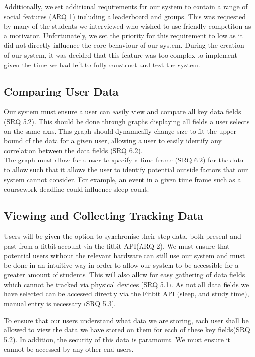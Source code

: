 \documentclass[12pt]{article}
\begin{document}
Additionally, we set additional requirements for our system to contain a range of social features (ARQ 1) including a leaderboard and groups. This was requested by many of the students we interviewed who wished to use friendly competiton as a motivator. Unfortunately, we set the priority for this requirement to low as it did not directly influence the core behaviour of our system. During the creation of our system, it was decided that this feature was too complex to implement given the time we had left to fully construct and test the system.


\subsection{Comparing User Data}

Our system must ensure a user can easily view and compare all key data fields (SRQ 5.2). This should be 
done through graphs displaying all fields a user selects on the same axis. 
This graph should dynamically change size to fit the upper bound of the data for a given user, 
allowing a user to easily identify any correlation between the data fields (SRQ 6.2).\\

The graph must allow for a user to 
specify a time frame (SRQ 6.2) for the data to allow such that 
it allows the user to identify potential outside factors
that our system cannot consider. For example, an event in a given time frame
such as a coursework deadline could influence sleep count. 


\subsection{Viewing and Collecting Tracking Data}

Users will be given the option to synchronise their step data, both present and past from a fitbit account via the fitbit API(ARQ 2). 
We must ensure that potential users without the
relevant hardware can still use our system and must be done in an intuitive way
in order to allow our system to be accessible for a greater amount of students.
This will also allow for easy gathering of data fields which cannot be tracked
via physical devices (SRQ 5.1). As not all data fields we have selected can be accessed
directly via the Fitbit API (sleep, and study time), manual entry is
necessary (SRQ 5.3).\newline

To ensure that our users understand what data we are storing, each user shall
be allowed to view the data we have stored on them for each of these key
fields(SRQ 5.2). In addition, the security of this data is paramount. We must ensure it
cannot be accessed by any other end users.
\end{document}
